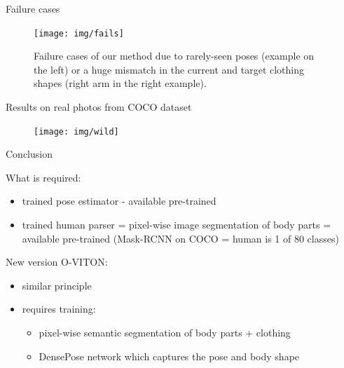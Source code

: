 \documentclass{beamer}
\begin{document}
\begin{frame}{Failure cases}

\begin{figure}[h]
\texttt{[image: img/fails]}
\caption{Failure cases of our method due to rarely-seen poses (example on the left) or a huge mismatch in the current and target clothing shapes (right arm in the right example).}
\end{figure}

\end{frame}
\begin{frame}{Results on real photos from COCO dataset}

\begin{figure}[h]
\texttt{[image: img/wild]}

\end{figure}

\end{frame}
\begin{frame}{Conclusion}

What is required:
\begin{itemize}
\item trained pose estimator - available pre-trained  \cite{cit:posenet}
\item trained human parser = pixel-wise image segmentation of body parts = available pre-trained (Mask-RCNN on COCO = human is 1 of 80 classes) \cite{cit:mask}
\end{itemize}

\vfill

New version O-VITON:
\begin{itemize}
\item similar principle
\item requires training:
\begin{itemize}
\item pixel-wise semantic segmentation of body parts + clothing
\item DensePose network which captures the pose and body shape
\end{itemize}
\end{itemize}

\end{frame}
\end{document}
